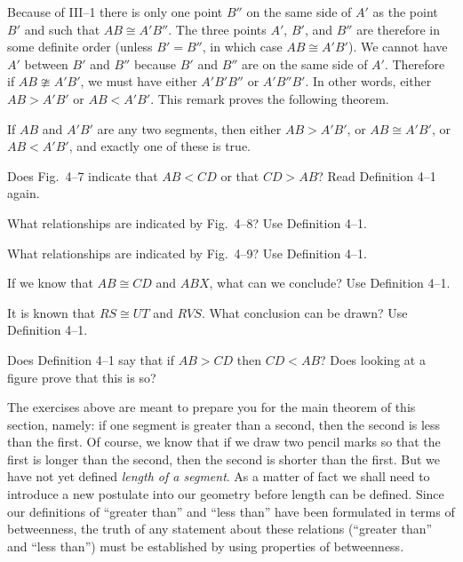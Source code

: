 \documentclass[11pt]{book}
\begin{document}
\FIGIVSIX

\begin{remark}
Because of III--1 there is only one point $B''$ on the same side of $A'$ as the
point $B'$ and such that $AB \cong A'B''$. The three points $A'$, $B'$, and
$B''$ are therefore in some definite order (unless $B' = B''$, in which case
$AB \cong A'B'$). We cannot have $A'$ between $B'$ and $B''$ because $B'$ and
$B''$ are on the same side of $A'$. Therefore if $AB \ncong A'B'$, we must have
either $A'B'B''$ or $A'B''B'$. In other words, either $AB > A'B'$ or
$AB < A'B'$. This remark proves the following theorem.
\end{remark}

\begin{theorem}
If $AB$ and $A'B'$ are any two segments, then either $AB > A'B'$, or
$AB \cong A'B'$, or $AB < A'B'$, and exactly one of these is true.
\end{theorem}


\begin{exercisecols}
\begin{exlist}
\item Does Fig.~4--7 indicate that $AB < CD$ or that $CD > AB$? Read
      Definition 4--1 again.
\exfig{\FIGIVSEVEN}
\item What relationships are indicated by Fig.~4--8? Use Definition 4--1.
\exfig{\FIGIVEIGHT}
\item What relationships are indicated by Fig.~4--9? Use Definition 4--1.
\exfig{\FIGIVNINE}
\item If we know that $AB \cong CD$ and $ABX$, what can we conclude? Use
      Definition 4--1.
\item It is known that $RS \cong UT$ and $RVS$. What conclusion can be drawn?
      Use Definition 4--1.
\item Does Definition 4--1 say that if $AB > CD$ then $CD < AB$? Does looking at
      a figure prove that this is so?
\end{exlist}
\end{exercisecols}

The exercises above are meant to prepare you for the main theorem of this
section, namely: if one segment is greater than a second, then the second is less
than the first. Of course, we know that if we draw two pencil marks so that the
first is longer than the second, then the second is shorter than the first. But
we have not yet defined \emph{length of a segment}. As a matter of fact we shall
need to introduce a new postulate into our geometry before length can be defined.
Since our definitions of ``greater than'' and ``less than'' have been formulated
in terms of betweenness, the truth of any statement about these relations
(``greater than'' and ``less than'') must be established by using properties of
betweenness.
\end{document}
